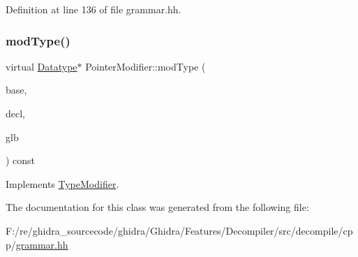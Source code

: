 Definition at line 136 of file grammar.\+hh.

\mbox{\label{class_pointer_modifier_a75a8aa9b1a6c8b9b4590a1b13f7b1f7a}} 
\subsubsection{\texorpdfstring{modType()}{modType()}}
{\footnotesize\ttfamily virtual \mbox{\hyperlink{class_datatype}{Datatype}}$\ast$ Pointer\+Modifier\+::mod\+Type (\begin{DoxyParamCaption}\item[{\mbox{\hyperlink{class_datatype}{Datatype}} $\ast$}]{base,  }\item[{const \mbox{\hyperlink{class_type_declarator}{Type\+Declarator}} $\ast$}]{decl,  }\item[{\mbox{\hyperlink{class_architecture}{Architecture}} $\ast$}]{glb }\end{DoxyParamCaption}) const\hspace{0.3cm}{\ttfamily [virtual]}}



Implements \mbox{\hyperlink{class_type_modifier_aa476545f31ae45f4bd39c8afb7403406}{Type\+Modifier}}.



The documentation for this class was generated from the following file\+:\begin{DoxyCompactItemize}
\item 
F\+:/re/ghidra\+\_\+sourcecode/ghidra/\+Ghidra/\+Features/\+Decompiler/src/decompile/cpp/\mbox{\hyperlink{grammar_8hh}{grammar.\+hh}}\end{DoxyCompactItemize}
